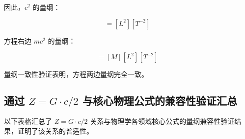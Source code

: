 \documentclass[12pt,a4paper]{article}
\begin{document}
因此，$c^2$ 的量纲：

\begin{equation}
[c^2] = [L^2][T^{-2}]
\label{eq:light_speed_squared_dimension}
\end{equation}

方程右边 $m c^2$ 的量纲：

\begin{equation}
[m c^2] = [M] [L^2][T^{-2}]
\label{eq:mass_light_speed_squared_dimension}
\end{equation}

量纲一致性验证表明，方程两边量纲完全一致。

\subsection{通过 $Z = G \cdot c / 2$ 与核心物理公式的兼容性验证汇总}
\label{subsection:core_physical_formula_compatibility}

以下表格汇总了 $Z = G \cdot c / 2$ 关系与物理学各领域核心公式的量纲兼容性验证结果，证明了该关系的普适性。
\end{document}
